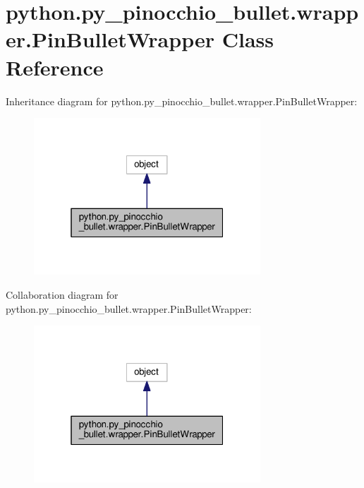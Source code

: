 \hypertarget{classpython_1_1py__pinocchio__bullet_1_1wrapper_1_1PinBulletWrapper}{}\section{python.\+py\+\_\+pinocchio\+\_\+bullet.\+wrapper.\+Pin\+Bullet\+Wrapper Class Reference}
\label{classpython_1_1py__pinocchio__bullet_1_1wrapper_1_1PinBulletWrapper}


Inheritance diagram for python.\+py\+\_\+pinocchio\+\_\+bullet.\+wrapper.\+Pin\+Bullet\+Wrapper\+:
\nopagebreak
\begin{figure}[H]
\begin{center}
\leavevmode
\includegraphics[width=241pt]{classpython_1_1py__pinocchio__bullet_1_1wrapper_1_1PinBulletWrapper__inherit__graph}
\end{center}
\end{figure}


Collaboration diagram for python.\+py\+\_\+pinocchio\+\_\+bullet.\+wrapper.\+Pin\+Bullet\+Wrapper\+:
\nopagebreak
\begin{figure}[H]
\begin{center}
\leavevmode
\includegraphics[width=241pt]{classpython_1_1py__pinocchio__bullet_1_1wrapper_1_1PinBulletWrapper__coll__graph}
\end{center}
\end{figure}
